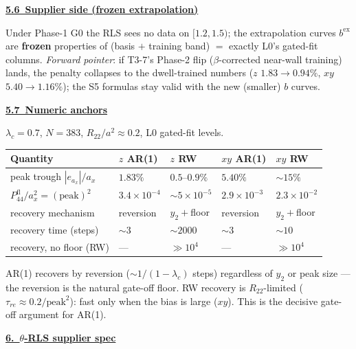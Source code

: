 \documentclass[11pt,a4paper,fontset=none]{ctexart}
\newcommand{\lc}{\lambda_c}
\newcommand{\hd}[1]{\par\medskip\noindent\underline{\textbf{#1}}\par\nobreak\vspace{0.2ex}}
\begin{document}
\hd{5.6\ Supplier side (frozen extrapolation)}
Under Phase-1 G0 the RLS sees no data on $[1.2,1.5)$; the extrapolation curves $b^{\mathrm{ex}}$ are \textbf{frozen} properties of (basis $+$ training band) $=$ exactly L0's gated-fit columns. \emph{Forward pointer}: if T3-7's Phase-2 flip ($\beta$-corrected near-wall training) lands, the penalty collapses to the dwell-trained numbers ($z$ $1.83\!\to\!0.94\%$, $xy$ $5.40\!\to\!1.16\%$); the S5 formulas stay valid with the new (smaller) $b$ curves.

\hd{5.7\ Numeric anchors}
$\lc{=}0.7$, $N{=}383$, $R_{22}/a^2\!\approx\!0.2$, L0 gated-fit levels.
\medskip

{\footnotesize\setlength{\tabcolsep}{6pt}
\begin{tabular}{@{}p{4.9cm} p{2.35cm} p{2.35cm} p{2.35cm} p{2.35cm}@{}}
\toprule
\textbf{Quantity} & $z$ AR(1) & $z$ RW & $xy$ AR(1) & $xy$ RW \\
\midrule
peak trough $|e_{a_x}|/a_x$              & $1.83\%$ & $0.5$--$0.9\%$ & $5.40\%$ & $\sim\!15\%$ \\
$P_{44}^{\mathrm{fl}}/a_x^2=(\text{peak})^2$ & $3.4\!\times\!10^{-4}$ & $\sim\!5\!\times\!10^{-5}$ & $2.9\!\times\!10^{-3}$ & $2.3\!\times\!10^{-2}$ \\
recovery mechanism                       & reversion & $y_2{+}$floor & reversion & $y_2{+}$floor \\
recovery time (steps)                    & $\sim\!3$ & $\sim\!2000$ & $\sim\!3$ & $\sim\!10$ \\
recovery, no floor (RW)                  & --- & $\gg\!10^4$ & --- & $\gg\!10^4$ \\
\bottomrule
\end{tabular}
}

\medskip
{\small AR(1) recovers by reversion ($\sim\!1/(1{-}\lc)$ steps) regardless of $y_2$ or peak size --- the reversion is the natural gate-off floor. RW recovery is $R_{22}$-limited ($\tau_{re}\!\approx\!0.2/\text{peak}^2$): fast only when the bias is large ($xy$). This is the decisive gate-off argument for AR(1).}

\newpage
\hd{6.\ $\theta$-RLS supplier spec}
\end{document}
